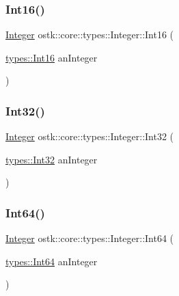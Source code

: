 \mbox{\label{classostk_1_1core_1_1types_1_1_integer_a79a833b5c9789c7a6f36eb203e7e4f67}} 
\subsubsection{\texorpdfstring{Int16()}{Int16()}}
{\footnotesize\ttfamily \hyperlink{classostk_1_1core_1_1types_1_1_integer}{Integer} ostk\+::core\+::types\+::\+Integer\+::\+Int16 (\begin{DoxyParamCaption}\item[{\hyperlink{namespaceostk_1_1core_1_1types_a88d90d717aac6c91b44fd07ec87cf3da}{types\+::\+Int16}}]{an\+Integer }\end{DoxyParamCaption})\hspace{0.3cm}{\ttfamily [static]}}

\mbox{\label{classostk_1_1core_1_1types_1_1_integer_a19c51e1678e5f1c81f56de9e8abae1c0}} 
\subsubsection{\texorpdfstring{Int32()}{Int32()}}
{\footnotesize\ttfamily \hyperlink{classostk_1_1core_1_1types_1_1_integer}{Integer} ostk\+::core\+::types\+::\+Integer\+::\+Int32 (\begin{DoxyParamCaption}\item[{\hyperlink{namespaceostk_1_1core_1_1types_abc111a0d1129d03945e9bc2e975158ab}{types\+::\+Int32}}]{an\+Integer }\end{DoxyParamCaption})\hspace{0.3cm}{\ttfamily [static]}}

\mbox{\label{classostk_1_1core_1_1types_1_1_integer_a972bbf8a659c7925134c811101f86612}} 
\subsubsection{\texorpdfstring{Int64()}{Int64()}}
{\footnotesize\ttfamily \hyperlink{classostk_1_1core_1_1types_1_1_integer}{Integer} ostk\+::core\+::types\+::\+Integer\+::\+Int64 (\begin{DoxyParamCaption}\item[{\hyperlink{namespaceostk_1_1core_1_1types_ad98fda0b92ffe48abffa77d65cb42113}{types\+::\+Int64}}]{an\+Integer }\end{DoxyParamCaption})\hspace{0.3cm}{\ttfamily [static]}}

